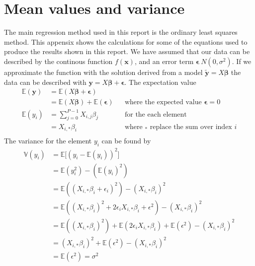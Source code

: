 \thispagestyle{plain}
\section{Mean values and variance}\label{sec:appendix_a}
%
\noindent The main regression method used in this report is the ordinary least squares method.
This appensix shows the calculations for some of the equations used to produce the results shown in this report.
%
We have assumed that our data can be described by the continous function 
$f(\boldsymbol{x})$, and an error term $\boldsymbol{\epsilon} ~ N(0, \sigma^{2})$. 
If we approximate the function with the solution derived from a model $\boldsymbol{\tilde{y}} = X\boldsymbol{\beta}$ the data can be described with $\boldsymbol{y} = X\boldsymbol{\beta} + \boldsymbol{\epsilon}$. 
The expectation value 
%
\begin{align*}
    \mathbb{E}(\boldsymbol{y}) &= \mathbb{E}(X\boldsymbol{\beta} + \boldsymbol{\epsilon}) \\
    &= \mathbb{E}(X\boldsymbol{\beta}) + \mathbb{E}(\boldsymbol{\epsilon}) && \text{where the expected value $\boldsymbol{\epsilon} = 0$} \\
    \mathbb{E}(y_{i}) &= \sum_{j=0}^{P-1} X_{i,j} \beta_{j} && \text{for the each element} \\
    &= X_{i,*} \beta_{i} && \text{where $_{*}$ replace the sum over index $i$} \\
\end{align*}
%
The variance for the element $y_{i}$ can be found by
\begin{align*}
    \mathbb{V}(y_{i}) &= \mathbb{E} \big[ (y_{i} - \mathbb{E}(y_{i}))^{2} \big] \\
    &= \mathbb{E} (y_{i}^{2}) - (\mathbb{E}(y_{i})^{2}) \\
    &= \mathbb{E} ((X_{i,*} \beta_{i} + \epsilon_{i})^{2}) - (X_{i,*} \beta_{i})^{2} \\
    &= \mathbb{E} ((X_{i,*} \beta_{i})^{2} + 2\epsilon_{i}X_{i,*} \beta_{i} + \epsilon^{2}) - (X_{i,*} \beta_{i})^{2} \\
    &= \mathbb{E} ((X_{i,*} \beta_{i})^{2}) + \mathbb{E} (2\epsilon_{i}X_{i,*} \beta_{i}) + \mathbb{E} (\epsilon^{2}) - (X_{i,*} \beta_{i})^{2} \\
    &= (X_{i,*} \beta_{i})^{2} + \mathbb{E} (\epsilon^{2}) - (X_{i,*} \beta_{i})^{2} \\
    &= \mathbb{E} (\epsilon^{2}) = \sigma^{2} \\
\end{align*}
